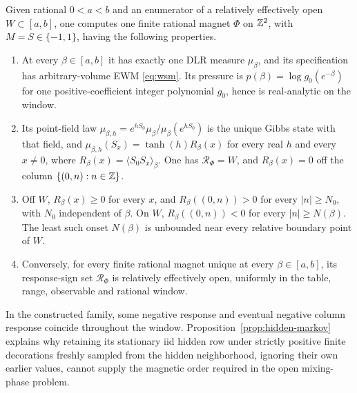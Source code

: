 \begin{theoremG}\label{thm:G}
Given rational \(0<a<b\) and an enumerator of a relatively effectively open \(W\subset[a,b]\), one computes one finite rational magnet \(\Phi\) on \(\mathbb Z^2\), with \(M=S\in\{-1,1\}\), having the following properties.
\begin{enumerate}[label=\textup{(\roman*)}]
\item At every \(\beta\in[a,b]\) it has exactly one DLR measure \(\mu_\beta\), and its specification has arbitrary-volume EWM \eqref{eq:wsm}. Its pressure is \(p(\beta)=\log g_0(e^{-\beta})\) for one positive-coefficient integer polynomial \(g_0\), hence is real-analytic on the window.
\item Its point-field law \(\mu_{\beta,h}=e^{hS_0}\mu_\beta/\mu_\beta(e^{hS_0})\) is the unique Gibbs state with that field, and \(\mu_{\beta,h}(S_x)=\tanh(h)R_\beta(x)\) for every real \(h\) and every \(x\ne0\), where \(R_\beta(x)=\langle S_0S_x\rangle_\beta\). One has \(\mathcal R_\Phi=W\), and \(R_\beta(x)=0\) off the column \(\{(0,n):n\in\mathbb Z\}\).
\item Off \(W\), \(R_\beta(x)\ge0\) for every \(x\), and \(R_\beta((0,n))>0\) for every \(|n|\ge N_0\), with \(N_0\) independent of \(\beta\). On \(W\), \(R_\beta((0,n))<0\) for every \(|n|\ge N(\beta)\). The least such onset \(N(\beta)\) is unbounded near every relative boundary point of \(W\).
\item Conversely, for every finite rational magnet unique at every \(\beta\in[a,b]\), its response-sign set \(\mathcal R_\Phi\) is relatively effectively open, uniformly in the table, range, observable and rational window.
\end{enumerate}
\end{theoremG}

In the constructed family, some negative response and eventual negative column response coincide throughout the window. Proposition~\ref{prop:hidden-markov} explains why retaining its stationary iid hidden row under strictly positive finite decorations freshly sampled from the hidden neighborhood, ignoring their own earlier values, cannot supply the magnetic order required in the open mixing-phase problem.

